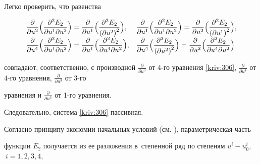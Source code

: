 Легко проверить,  что равенства 

\begin{equation*}

\begin{array}{ll}

\displaystyle 

\frac{\partial }{\partial u^{2}}\Bigl( \frac{\partial ^{2}E_{2}}{\partial u^{1}\partial u^{2}}\Bigr) =

\frac{\partial }{\partial u^{1}}\Bigl( \frac{\partial ^{2}E_{2}}{\left( \partial u^{2}\right) ^{2}}\Bigr), &

\displaystyle 

\frac{\partial }{\partial u^{1}}\Bigl( \frac{\partial ^{2}E_{2}}{\partial u^{1}\partial u^{2}}\Bigr) =

\frac{\partial }{\partial u^{2}}\Bigl( \frac{\partial ^{2}E_{2}}{\left( \partial u^{1}\right) ^{2}}\Bigr) , 

\\[2mm]

\displaystyle 

\frac{\partial }{\partial u^{4}}\Bigl( \frac{\partial ^{2}E_{2}}{\partial u^{1}\partial u^{2}}\Bigr) =

\frac{\partial }{\partial u^{1}}\Bigl( \frac{\partial ^{2}E_{2}}{\partial u^{4}\partial u^{2}}\Bigr) , &

\displaystyle 

\frac{\partial }{\partial u^{4}}\Bigl( \frac{\partial ^{2}E_{2}}{\left( \partial u^{2}\right) ^{2}}\Bigr) =

\frac{\partial }{\partial u^{2}}\Bigl( \frac{\partial ^{2}E_{2}}{\partial u^{4}\partial u^{2}}\Bigr) 

\end{array}

\end{equation*}

совпадают, соответственно, с производной $\frac{\partial }{\partial u^{3}}$ от 4-го уравнения \eqref{kriv:306}, $\frac{\partial }{\partial u^{4}}$ от 4-го уравнения, $\frac{\partial }{\partial u^{3}}$ от 3-го 

уравнения и $\frac{\partial }{\partial u^{3}}$ от 1-го уравнения. 

Следовательно, система \eqref{kriv:306} пассивная. 

Согласно принципу экономии начальных условий (см. \cite{bib:kriv:7}), параметрическая часть 

функции $E_{2}$ получается из  ее разложения в~степенной ряд по степеням $u^{i}-u_{0}^{i},$ $\ i=1,2,3,4$, 

